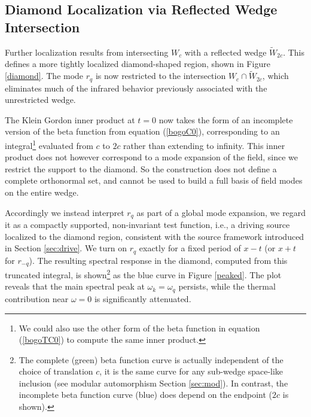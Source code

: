 \documentclass[12pt,a4paper]{article}
\begin{document}
{\subsection{Diamond Localization via Reflected Wedge Intersection}

Further localization results from intersecting $W_c$ with a reflected wedge $\widetilde{W}_{2c}$. This defines a more tightly localized diamond-shaped region, shown in Figure \ref{diamond}. The mode $r_q$ is now restricted to the intersection $W_c \cap \widetilde{W}_{2c}$, which eliminates much of the infrared behavior previously associated with the unrestricted wedge.

The Klein Gordon inner product at $t=0$ now takes the form of an incomplete version of the beta function from equation (\ref{bogoC0}), corresponding to an integral\footnote{We could also use the other form of the beta function in equation (\ref{bogoTC0}) to compute the same inner product.} evaluated from $c$ to $2c$ rather than extending to infinity. This inner product does not however correspond to a mode expansion of the field, since we restrict the support to the diamond. So the construction does not define a complete orthonormal set, and cannot be used to build a full basis of field modes on the entire wedge.

Accordingly we instead interpret $r_q$ as part of a global mode expansion, we regard it as a compactly supported, non-invariant test function, i.e., a driving source localized to the diamond region, consistent with the source framework introduced in Section \ref{sec:drive}. We turn on $r_q$ exactly for a fixed period of $x-t$ (or $x+t$ for $r_{-q}$). The resulting spectral response in the diamond, computed from this truncated integral, is shown\footnote{The complete (green) beta function curve is actually independent of the choice of translation $c$, it is the same curve for any sub-wedge space-like inclusion (see modular automorphism Section \ref{sec:mod}). In contrast, the incomplete beta function curve (blue) does depend on the endpoint ($2c$ is shown).} as the blue curve in Figure \ref{peaked}. The plot reveals that the main spectral peak at $\omega_k = \omega_q$ persists, while the thermal contribution near $\omega = 0$ is significantly attenuated.

}
\end{document}
